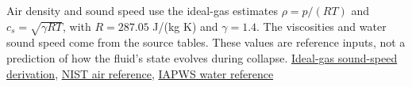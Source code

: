 \documentclass[
  english,
  11pt,
]{article}
\begin{document}
Air density and sound speed use the ideal-gas estimates \(\rho=p/(RT)\)
and \(c_s=\sqrt{\gamma RT}\), with \(R=287.05\) J/(kg K) and
\(\gamma=1.4\). The viscosities and water sound speed come from the
source tables. These values are reference inputs, not a prediction of
how the fluid's state evolves during collapse.
\href{https://www.grc.nasa.gov/www/k-12/BGP/snddrv.html}{Ideal-gas
sound-speed derivation},
\href{https://nvlpubs.nist.gov/nistpubs/jres/110/1/j110-1kim.pdf}{NIST
air reference},
\href{https://iapws.org/technical-guidance/release/LiquidWater.download}{IAPWS
water reference}
\end{document}
